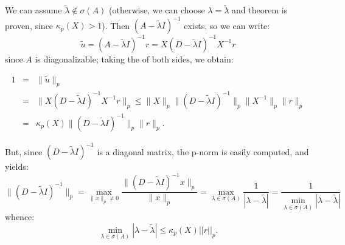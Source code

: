 \documentclass[12pt]{article}
\begin{document}
We can assume $\tilde{\lambda}\notin\sigma(A)$ (otherwise, we can choose $\lambda=\tilde{\lambda}$ and theorem is proven, since $\kappa_p(X)>1$).
Then $(A-\tilde{\lambda} I)^{-1}$ exists, so we can write:
\[
\tilde{u}=(A-\tilde{\lambda} I)^{-1}r=X(D-\tilde{\lambda} I)^{-1}X^{-1}r
\]
since $A$ is diagonalizable; taking the  of both sides, we obtain:

\begin{eqnarray*}
1&=&\|\tilde{u}\|_p\\
&=& \|X(D-\tilde{\lambda} I)^{-1}X^{-1}r\|_p \leq \|X\|_p \|(D-\tilde{\lambda} I)^{-1}\|_p \|X^{-1}\|_p \|r\|_p\\
&=& \kappa_p(X)\|(D-\tilde{\lambda} I)^{-1}\|_p \|r\|_p.
\end{eqnarray*}

But, since $(D-\tilde{\lambda} I)^{-1}$ is a diagonal matrix, the p-norm is easily computed, and yields:
\[
\|(D-\tilde{\lambda} I)^{-1}\|_p=\max\limits_{\|x\|_p \ne 0}\frac{\|(D-\tilde{\lambda} I)^{-1}x\|_p}{\|x\|_p}=\max\limits_{\lambda\in\sigma(A)} \frac{1}{|\lambda-\tilde{\lambda}|}=\frac{1}{\min\limits_{\lambda\in\sigma(A)}|\lambda-\tilde{\lambda}|}
\]
whence:
\[
\min\limits_{\lambda\in\sigma(A)}|\lambda-\tilde{\lambda}|\leq\kappa_p(X)||r||_p.
\]
\end{document}

